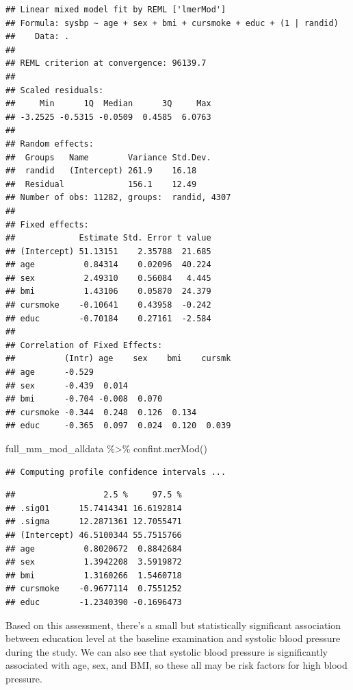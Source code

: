 \documentclass[
]{book}
\newenvironment{Shaded}{\begin{snugshade}}{\end{snugshade}}
\newcommand{\FunctionTok}[1]{\textcolor[rgb]{0.00,0.00,0.00}{#1}}
\newcommand{\NormalTok}[1]{#1}
\newcommand{\SpecialCharTok}[1]{\textcolor[rgb]{0.00,0.00,0.00}{#1}}
\begin{document}
\begin{verbatim}
## Linear mixed model fit by REML ['lmerMod']
## Formula: sysbp ~ age + sex + bmi + cursmoke + educ + (1 | randid)
##    Data: .
## 
## REML criterion at convergence: 96139.7
## 
## Scaled residuals: 
##     Min      1Q  Median      3Q     Max 
## -3.2525 -0.5315 -0.0509  0.4585  6.0763 
## 
## Random effects:
##  Groups   Name        Variance Std.Dev.
##  randid   (Intercept) 261.9    16.18   
##  Residual             156.1    12.49   
## Number of obs: 11282, groups:  randid, 4307
## 
## Fixed effects:
##             Estimate Std. Error t value
## (Intercept) 51.13151    2.35788  21.685
## age          0.84314    0.02096  40.224
## sex          2.49310    0.56084   4.445
## bmi          1.43106    0.05870  24.379
## cursmoke    -0.10641    0.43958  -0.242
## educ        -0.70184    0.27161  -2.584
## 
## Correlation of Fixed Effects:
##          (Intr) age    sex    bmi    cursmk
## age      -0.529                            
## sex      -0.439  0.014                     
## bmi      -0.704 -0.008  0.070              
## cursmoke -0.344  0.248  0.126  0.134       
## educ     -0.365  0.097  0.024  0.120  0.039
\end{verbatim}

\begin{Shaded}
\begin{Highlighting}[]
\NormalTok{full\_mm\_mod\_alldata }\SpecialCharTok{\%\textgreater{}\%} 
  \FunctionTok{confint.merMod}\NormalTok{()}
\end{Highlighting}
\end{Shaded}

\begin{verbatim}
## Computing profile confidence intervals ...
\end{verbatim}

\begin{verbatim}
##                  2.5 %     97.5 %
## .sig01      15.7414341 16.6192814
## .sigma      12.2871361 12.7055471
## (Intercept) 46.5100344 55.7515766
## age          0.8020672  0.8842684
## sex          1.3942208  3.5919872
## bmi          1.3160266  1.5460718
## cursmoke    -0.9677114  0.7551252
## educ        -1.2340390 -0.1696473
\end{verbatim}

Based on this assessment, there's a small but statistically significant
association between education level at the baseline examination and
systolic blood pressure during the study. We can also see that systolic
blood pressure is significantly associated with age, sex, and BMI, so
these all may be risk factors for high blood pressure.
\end{document}
